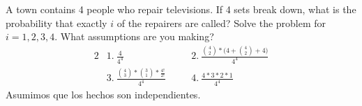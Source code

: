 \item A town contains 4 people who repair televisions. If 4 sets break down, what is the probability that exactly $i$ of the repairers are called? Solve the problem for $i = 1,2,3,4$. What assumptions are you making?
\begin{alignat*}{2}
    &1.\ \frac{4}{4^4}\quad 
    &&2.\ \frac{\binom{4}{2} * \big(4 + \binom{4}{2} + 4 \big)}{4^4}\\
    &3.\ \frac{\binom{4}{3} * \binom{3}{1} * \frac{4!}{2!}}{4^4}\quad 
    &&4.\ \frac{4 * 3 * 2 * 1}{4^4}
\end{alignat*}
Asumimos que los hechos son independientes.